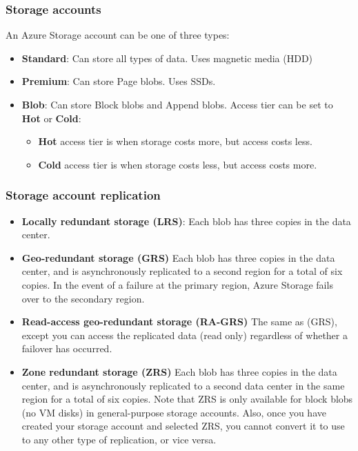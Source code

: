 \documentclass[12pt]{article}
\begin{document}
\subsubsection{Storage accounts}
An Azure Storage account can be one of three types:
\begin{itemize}
    \item \textbf{Standard}: Can store all types of data. Uses magnetic media (HDD)
    \item \textbf{Premium}: Can store Page blobs. Uses SSDs. 
    \item \textbf{Blob}: Can store Block blobs and Append blobs. Access tier can be set to \textbf{Hot} or \textbf{Cold}: 
    \begin{itemize}
        \item \textbf{Hot} access tier is when storage costs more, but access costs less.
        \item \textbf{Cold} access tier is when storage costs less, but access costs more.
    \end{itemize}
\end{itemize}

\subsubsection{Storage account replication}
\begin{itemize}
    \item \textbf{Locally redundant storage (LRS)}: Each blob has three copies in the data center.
    \item \textbf{Geo-redundant storage (GRS)} Each blob has three copies in the data center, and is asynchronously replicated to a second region for a total of six copies. In the event of a failure at the primary region, Azure Storage fails over to the secondary region.
    \item \textbf{Read-access geo-redundant storage (RA-GRS)} The same as (GRS), except you can access the replicated data (read only) regardless of whether a failover has occurred.
    \item \textbf{Zone redundant storage (ZRS)} Each blob has three copies in the data center, and is asynchronously replicated to a second data center in the same region for a total of six copies. Note that ZRS is only available for block blobs (no VM disks) in general-purpose storage accounts. Also, once you have created your storage account and selected ZRS, you cannot convert it to use to any other type of replication, or vice versa.
\end{itemize}
\end{document}
